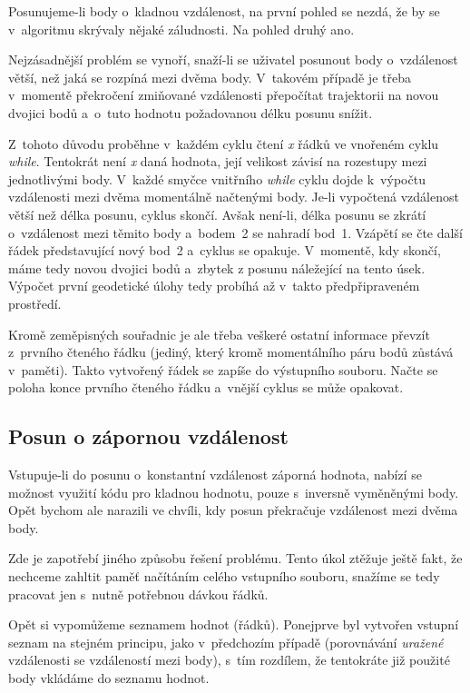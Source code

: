 Posunujeme-li body o~kladnou vzdálenost, na první pohled se nezdá, že by se v~algoritmu skrývaly
nějaké záludnosti. Na pohled druhý ano. 

Nejzásadnější problém se vynoří, snaží-li se uživatel posunout body o~vzdálenost větší, než
jaká se rozpíná mezi dvěma body. V~takovém případě je třeba v~momentě překročení zmiňované
vzdálenosti přepočítat trajektorii na novou dvojici bodů a~o~tuto hodnotu požadovanou
délku posunu snížit. 

Z~tohoto důvodu proběhne v~každém cyklu čtení \textit{x} řádků ve vnořeném cyklu \textit{while}.
Tentokrát není \textit{x} daná hodnota, její velikost závisí na rozestupy mezi jednotlivými body.
V~každé smyčce vnitřního \textit{while} cyklu dojde k~výpočtu vzdálenosti mezi dvěma momentálně
načtenými body. Je-li vypočtená vzdálenost větší než délka posunu, cyklus skončí. 
Avšak není-li, délka posunu se zkrátí o~vzdálenost mezi těmito body a~bodem~2 se nahradí bod~1.
Vzápětí se čte další řádek představující nový bod~2 a~cyklus se opakuje. V~momentě, kdy
skončí, máme tedy novou dvojici bodů a~zbytek z posunu náležející na tento úsek.
Výpočet první geodetické úlohy tedy probíhá až v~takto předpřipraveném prostředí. 

Kromě zeměpisných souřadnic je ale třeba veškeré ostatní informace převzít z~prvního
čteného řádku (jediný, který kromě momentálního páru bodů zůstává v~paměti). Takto vytvořený
řádek se zapíše do výstupního souboru. Načte se poloha konce prvního čteného řádku
a~vnější cyklus se může opakovat. 

\subsection{Posun o zápornou vzdálenost}
\label{zapornavzdalenost}

Vstupuje-li do posunu o~konstantní vzdálenost záporná hodnota, nabízí se možnost
využití kódu pro kladnou hodnotu, pouze s~inversně vyměněnými body. Opět bychom ale narazili
ve chvíli, kdy posun překračuje vzdálenost mezi dvěma body. 

Zde je zapotřebí jiného způsobu řešení problému. Tento úkol ztěžuje ještě fakt, že nechceme
zahltit paměť načítáním celého vstupního souboru, snažíme se tedy pracovat jen s~nutně
potřebnou dávkou řádků. 

Opět si vypomůžeme seznamem hodnot (řádků). Ponejprve byl vytvořen vstup\-ní seznam
na stejném principu, jako v~předchozím případě (porovnávání \textit{uražené} vzdálenosti se
vzdáleností mezi body), s~tím rozdílem, že tentokráte již použité body vkládáme do seznamu hodnot.

